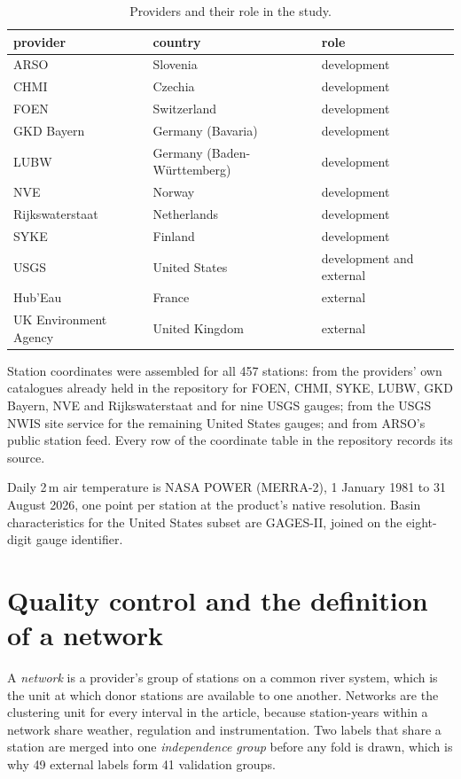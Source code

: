 \documentclass[draft]{agujournal2025}
\begin{document}
\begin{table}
\caption{Providers and their role in the study.}
\label{tab:si-providers}
\centering
\begin{tabular}{lll}
\hline
provider & country & role \\
\hline
ARSO & Slovenia & development \\
CHMI & Czechia & development \\
FOEN & Switzerland & development \\
GKD Bayern & Germany (Bavaria) & development \\
LUBW & Germany (Baden-W\"urttemberg) & development \\
NVE & Norway & development \\
Rijkswaterstaat & Netherlands & development \\
SYKE & Finland & development \\
USGS & United States & development and external \\
Hub'Eau & France & external \\
UK Environment Agency & United Kingdom & external \\
\hline
\end{tabular}
\end{table}

Station coordinates were assembled for all 457 stations: from the providers'
own catalogues already held in the repository for FOEN, CHMI, SYKE, LUBW, GKD
Bayern, NVE and Rijkswaterstaat and for nine USGS gauges; from the USGS NWIS
site service for the remaining United States gauges; and from ARSO's public
station feed. Every row of the coordinate table in the repository records its
source.

Daily 2\,m air temperature is NASA POWER (MERRA-2), 1 January 1981 to 31 August
2026, one point per station at the product's native resolution. Basin
characteristics for the United States subset are GAGES-II, joined on the
eight-digit gauge identifier.

\section{Quality control and the definition of a network}

A \emph{network} is a provider's group of stations on a common river system,
which is the unit at which donor stations are available to one another. Networks
are the clustering unit for every interval in the article, because station-years
within a network share weather, regulation and instrumentation. Two labels that
share a station are merged into one \emph{independence group} before any fold is
drawn, which is why 49 external labels form 41 validation groups.
\end{document}
